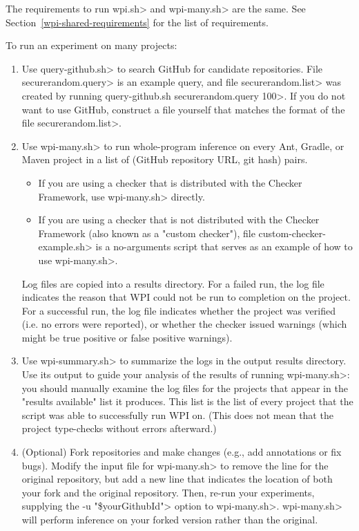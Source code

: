 
The requirements to run \<wpi.sh> and \<wpi-many.sh> are the same. See Section~\ref{wpi-shared-requirements}
for the list of requirements.

To run an experiment on many projects:
\begin{enumerate}
\item Use \<query-github.sh> to search GitHub for candidate repositories.
File \<securerandom.query> is an example query, and file
\<securerandom.list>
was created by running \<query-github.sh securerandom.query 100>. If you do
not want to use GitHub, construct a file yourself that matches the format of
the file \<securerandom.list>.

\item Use \<wpi-many.sh> to run whole-program inference on every
Ant, Gradle, or Maven project in a list of (GitHub repository URL, git hash)
pairs.
\begin{itemize}
\item If you are using a checker that is distributed with the Checker
Framework, use \<wpi-many.sh> directly.
\item If you are using a checker that is not distributed with the Checker
Framework (also known as a "custom checker"), file
\<custom-checker-example.sh> is a no-arguments
script that serves as an example of how to use \<wpi-many.sh>.
\end{itemize}

Log files are copied into a results directory.
For a failed run, the log file indicates the reason that WPI could not
be run to completion on the project.
For a successful run, the log file indicates whether the project was verified
(i.e. no errors were reported), or whether the checker issued warnings
(which might be true positive or false positive warnings).

\item Use \<wpi-summary.sh> to summarize the logs in the output results directory.
Use its output to guide your analysis of the results of running \<wpi-many.sh>:
you should manually examine the log files for the projects that appear in the
"results available" list it produces. This list is the list of every project
that the script was able to successfully run WPI on.  (This does not mean
that the project type-checks without errors afterward.)

\item (Optional) Fork repositories and make changes (e.g., add annotations or fix bugs).
Modify the input file for \<wpi-many.sh> to remove the line for the original repository,
but add a new line that indicates the location of both your
fork and the original repository.
Then, re-run your experiments, supplying the \<-u "\$yourGithubId"> option to \<wpi-many.sh>.
\<wpi-many.sh> will perform inference on your forked version rather than
the original.

\end{enumerate}

